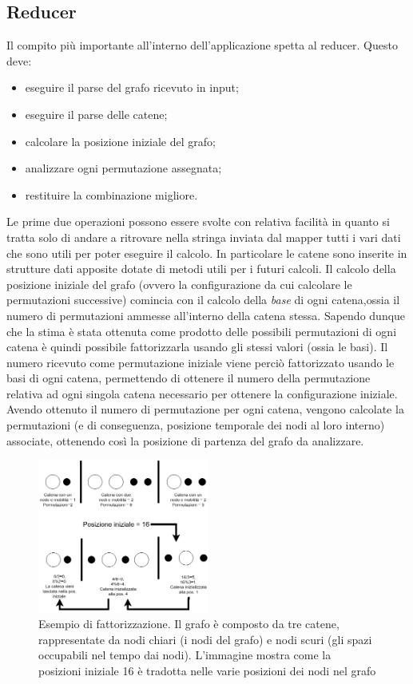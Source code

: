 \documentclass[]{IEEEtran}
\begin{document}
\subsection{Reducer}
Il compito più importante all'interno dell'applicazione spetta al reducer. Questo deve:
\begin{itemize}
	\item eseguire il parse del grafo ricevuto in input;
	\item eseguire il parse delle catene;
	\item calcolare la posizione iniziale del grafo;
	\item analizzare ogni permutazione assegnata;
	\item restituire la combinazione migliore.
\end{itemize}
Le prime due operazioni possono essere svolte con relativa facilità in quanto si tratta solo di andare a ritrovare nella stringa inviata dal mapper tutti i vari dati che sono utili per poter eseguire il calcolo. In particolare le catene sono inserite in strutture dati apposite dotate di metodi utili per i futuri calcoli. 
Il calcolo della posizione iniziale del grafo (ovvero la configurazione da cui calcolare le permutazioni successive) comincia con il calcolo della \emph{base} di ogni catena,ossia il numero di permutazioni ammesse all'interno della catena stessa. Sapendo dunque che la stima è stata ottenuta come prodotto delle possibili permutazioni di ogni catena è quindi possibile fattorizzarla usando gli stessi valori (ossia le basi). Il numero ricevuto come permutazione iniziale viene perciò fattorizzato usando le basi di ogni catena, permettendo di ottenere il numero della permutazione relativa ad ogni singola catena necessario per ottenere la configurazione iniziale. Avendo ottenuto il numero di permutazione per ogni catena, vengono calcolate la permutazioni (e di conseguenza, posizione temporale dei nodi al loro interno) associate, ottenendo così la posizione di partenza del grafo da analizzare.
\begin{figure}[htp]
	\centering
	\includegraphics[width=0.5\textwidth]{images/fact.png}
	\caption{Esempio di fattorizzazione. Il grafo è composto da tre catene, rappresentate da nodi chiari (i nodi del grafo) e nodi scuri (gli spazi occupabili nel tempo dai nodi). L'immagine mostra come la posizioni iniziale 16 è tradotta nelle varie posizioni dei nodi nel grafo}
\end{figure}
\end{document}
